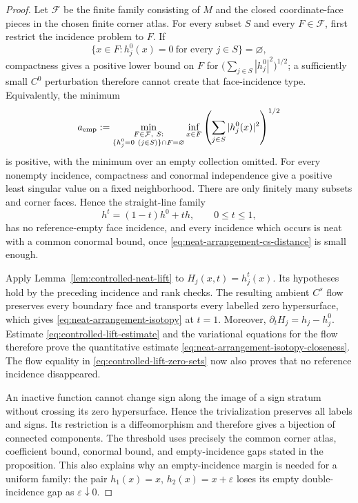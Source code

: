 \documentclass[11pt]{amsart}
\numberwithin{equation}{section}
\theoremstyle{definition}
\theoremstyle{remark}
\begin{document}
\begin{proof}
Let $\mathcal F$ be the finite family consisting of $M$ and the closed
coordinate-face pieces in the chosen finite corner atlas.  For every subset
$S$ and every $F\in\mathcal F$, first restrict the incidence problem to
$F$.  If
\[
 \{x\in F:h_j^0(x)=0\ \text{for every }j\in S\}=\varnothing,
\]
compactness gives a positive lower bound on $F$ for
$\bigl(\sum_{j\in S}|h_j^0|^2\bigr)^{1/2}$; a sufficiently small $C^0$
perturbation therefore cannot create that face-incidence type.  Equivalently,
the minimum
\[
 a_{\rm emp}:=
 \min_{\substack{F\in\mathcal F,\ S:\\
       \{h_j^0=0\ (j\in S)\}\cap F=\varnothing}}
 \inf_{x\in F}\left(\sum_{j\in S}|h_j^0(x)|^2\right)^{1/2}
\]
is positive, with the minimum over an empty collection omitted.  For every
nonempty incidence, compactness and conormal independence give a positive
least singular value on a fixed neighborhood.  There are only finitely many
subsets and corner faces.  Hence
the straight-line family
\[
 h^t=(1-t)h^0+th,\qquad 0\le t\le1,
\]
has no reference-empty face incidence, and every incidence which occurs is
neat with a common conormal bound, once
\eqref{eq:neat-arrangement-cs-distance} is small enough.

Apply Lemma~\ref{lem:controlled-neat-lift} to
$H_j(x,t)=h_j^t(x)$.  Its hypotheses hold by the preceding incidence and
rank checks.  The resulting ambient $C^s$ flow preserves every boundary
face and transports every labelled zero hypersurface, which gives
\eqref{eq:neat-arrangement-isotopy} at $t=1$.  Moreover,
$\partial_tH_j=h_j-h_j^0$.  Estimate
\eqref{eq:controlled-lift-estimate} and the variational equations for the
flow therefore prove the quantitative estimate
\eqref{eq:neat-arrangement-isotopy-closeness}.  The flow equality in
\eqref{eq:controlled-lift-zero-sets} now also proves that no reference
incidence disappeared.

An inactive function cannot change sign along the image of a sign stratum
without crossing its zero hypersurface.  Hence the trivialization preserves
all labels and signs.  Its restriction is a diffeomorphism and therefore
gives a bijection of connected components.  The threshold uses precisely
the common corner atlas, coefficient bound, conormal bound, and
empty-incidence gaps stated in the proposition.  This also explains why
an empty-incidence margin is needed for a uniform family: the pair
$h_1(x)=x$, $h_2(x)=x+\varepsilon$ loses its empty double-incidence gap as
$\varepsilon\downarrow0$.
\end{proof}
\end{document}

